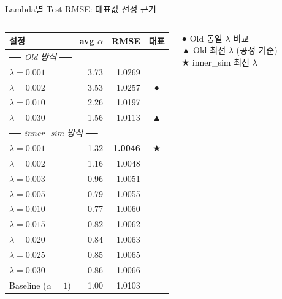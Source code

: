 \documentclass[aspectratio=169,10pt]{beamer}
\begin{document}
\begin{frame}[shrink=15]{Lambda별 Test RMSE: 대표값 선정 근거}
	\begin{columns}[T]
			\begin{center}
			\renewcommand{\arraystretch}{1.1}
			\begin{tabular}{l|r|r|c}
				\toprule
				\textbf{설정} & \textbf{avg $\alpha$} & \textbf{RMSE} & \textbf{대표} \\
				\midrule
				\multicolumn{4}{l}{\small\textit{── Old 방식 ──}} \\
				$\lambda=0.001$ & 3.73 & 1.0269 & \\
				$\lambda=0.002$ & 3.53 & 1.0257 & \textcolor{posblue}{●} \\
				$\lambda=0.010$ & 2.26 & 1.0197 & \\
				$\lambda=0.030$ & 1.56 & 1.0113 & \textcolor{negred}{▲} \\
				\midrule
				\multicolumn{4}{l}{\small\textit{── inner\_sim 방식 ──}} \\
				\rowcolor{testgreen!10}
				$\lambda=0.001$ & 1.32 & \textbf{1.0046} & \textcolor{testgreen}{★} \\
				\rowcolor{testgreen!10}
				$\lambda=0.002$ & 1.16 & 1.0048 & \\
				\rowcolor{testgreen!10}
				$\lambda=0.003$ & 0.96 & 1.0051 & \\
				\rowcolor{testgreen!10}
				$\lambda=0.005$ & 0.79 & 1.0055 & \\
				\rowcolor{testgreen!10}
				$\lambda=0.010$ & 0.77 & 1.0060 & \\
				\rowcolor{testgreen!10}
				$\lambda=0.015$ & 0.82 & 1.0062 & \\
				\rowcolor{testgreen!10}
				$\lambda=0.020$ & 0.84 & 1.0063 & \\
				\rowcolor{testgreen!10}
				$\lambda=0.025$ & 0.85 & 1.0065 & \\
				\rowcolor{testgreen!10}
				$\lambda=0.030$ & 0.86 & 1.0066 & \\
				\rowcolor{testgreen!5}
				Baseline ($\alpha=1$) & 1.00 & 1.0103 & \\
				\bottomrule
			\end{tabular}
			\end{center}

			{\small
			\textcolor{posblue}{●} Old 동일 $\lambda$ 비교\\
			\textcolor{negred}{▲} Old 최선 $\lambda$ (공정 기준)\\
			\textcolor{testgreen}{★} inner\_sim 최선 $\lambda$
			}


\end{columns}
\end{frame}
\end{document}
